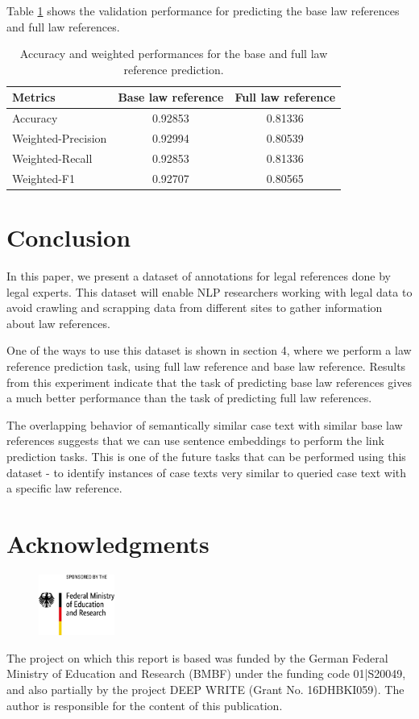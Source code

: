 \documentclass[sigconf]{acmart}
\begin{document}
Table \ref{tab:val-perform} shows the validation performance for predicting the base law references and full law references.

\begin{table}[h]
\centering
\caption{Accuracy and weighted performances for the base and full law reference prediction.}
\label{tab:val-perform}
\begin{tabular}{|l|c|c|}
\hline
\textbf{Metrics} & \textbf{Base law reference} & \textbf{Full law reference} \\
\hline
Accuracy & 0.92853 & 0.81336 \\
Weighted-Precision & 0.92994 & 0.80539 \\
Weighted-Recall & 0.92853 & 0.81336 \\
Weighted-F1 & 0.92707 & 0.80565 \\
\hline
\end{tabular}
\end{table}

\section{Conclusion}
\label{sec:conclusion}

In this paper, we present a dataset of annotations for legal references done by legal experts. This dataset will enable NLP researchers working with legal data to avoid crawling and scrapping data from different sites to gather information about law references.

One of the ways to use this dataset is shown in section 4, where we perform a law reference prediction task, using full law reference and base law reference. Results from this experiment indicate that the task of predicting base law references gives a much better performance than the task of predicting full law references.

The overlapping behavior of semantically similar case text with similar base law references suggests that we can use sentence embeddings to perform the link prediction tasks. This is one of the future tasks that can be performed using this dataset - to identify instances of case texts very similar to queried case text with a specific law reference.

\section{Acknowledgments}

\begin{figure}[h]
\includegraphics[width=2.5cm]{latex/BMBF.jpeg}
\end{figure} 

The project on which this report is based was funded by the German Federal Ministry of Education and Research (BMBF) under the funding code 01|S20049, and also partially by the project DEEP WRITE (Grant No. 16DHBKI059). The author is responsible for the content of this publication.



\end{document}
